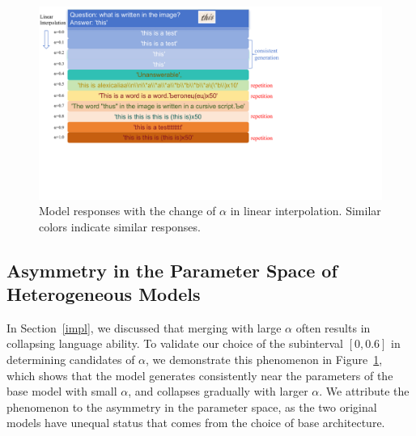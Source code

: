 \begin{figure}
    \centering
    \includegraphics[width=\linewidth, bb=0 0 678 389]{figure/crop_diff-case.pdf}
    \caption{Model responses with the change of $\alpha$ in linear interpolation. Similar colors indicate similar responses.  }
    \label{fig:asymmetry}
\end{figure}

\subsection{Asymmetry in the Parameter Space of Heterogeneous Models} \label{sec:asymmetry_sec}
In Section~\ref{impl}, we discussed that merging with large $\alpha$ often results in collapsing language ability. To validate our choice of the subinterval $[0, 0.6]$ in determining candidates of $\alpha$, we demonstrate this phenomenon in Figure~\ref{fig:asymmetry}, which shows that the model generates consistently near the parameters of the base model with small $\alpha$, and collapses gradually with larger $\alpha$. We attribute the phenomenon to the asymmetry in the parameter space, as the two original models have unequal status that comes from the choice of base architecture.

